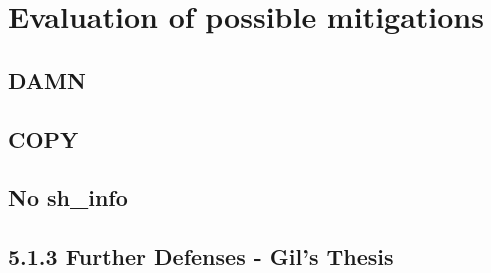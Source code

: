 \section{Evaluation of possible mitigations}
\subsection{DAMN}
\subsection{COPY}
\subsection{No sh\_info}
\subsection{5.1.3 Further Defenses - Gil's Thesis}